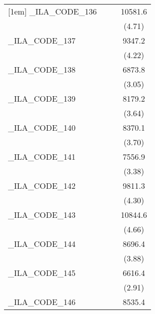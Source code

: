 {\begin{tabular}{l*{3}{c}}
[1em]
\_ILA\_CODE\_136&                     &                     &     10581.6\sym{***}\\
            &                     &                     &      (4.71)         \\
[1em]
\_ILA\_CODE\_137&                     &                     &      9347.2\sym{***}\\
            &                     &                     &      (4.22)         \\
[1em]
\_ILA\_CODE\_138&                     &                     &      6873.8\sym{**} \\
            &                     &                     &      (3.05)         \\
[1em]
\_ILA\_CODE\_139&                     &                     &      8179.2\sym{***}\\
            &                     &                     &      (3.64)         \\
[1em]
\_ILA\_CODE\_140&                     &                     &      8370.1\sym{***}\\
            &                     &                     &      (3.70)         \\
[1em]
\_ILA\_CODE\_141&                     &                     &      7556.9\sym{***}\\
            &                     &                     &      (3.38)         \\
[1em]
\_ILA\_CODE\_142&                     &                     &      9811.3\sym{***}\\
            &                     &                     &      (4.30)         \\
[1em]
\_ILA\_CODE\_143&                     &                     &     10844.6\sym{***}\\
            &                     &                     &      (4.66)         \\
[1em]
\_ILA\_CODE\_144&                     &                     &      8696.4\sym{***}\\
            &                     &                     &      (3.88)         \\
[1em]
\_ILA\_CODE\_145&                     &                     &      6616.4\sym{**} \\
            &                     &                     &      (2.91)         \\
[1em]
\_ILA\_CODE\_146&                     &                     &      8535.4\sym{***}\\

\end{tabular}}
